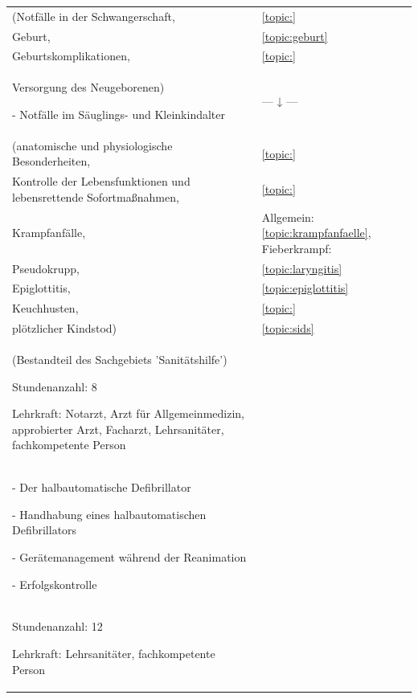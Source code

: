 \begin{xtabular}{p{10cm}p{5cm}}
(Notfälle in der Schwangerschaft,
& 
\ref{topic:}\noindent{}
\\
Geburt,
& 
\ref{topic:geburt}
\\
Geburtskomplikationen,
& 
\ref{topic:}\noindent{}
\\
Versorgung des Neugeborenen)

- Notfälle im Säuglings- und Kleinkindalter
& 
--- ↓ --- 
\\
(anatomische und physiologische Besonderheiten,
& 
\ref{topic:}\noindent{}
\\
Kontrolle der Lebensfunktionen und lebensrettende Sofortmaßnahmen,
& 
\ref{topic:}\noindent{}
\\
Krampfanfälle,
& 
Allgemein: \ref{topic:krampfanfaelle}, Fieberkrampf: \label{topic:fieberkrampf}
\\
Pseudokrupp,
& 
\ref{topic:laryngitis}
\\
Epiglottitis,
& 
\ref{topic:epiglottitis}
\\
Keuchhusten,
& 
\ref{topic:}\noindent{}
\\
plötzlicher Kindstod)
& 
\ref{topic:sids}
 \\\toprule
{}  

(Bestandteil des Sachgebiets  'Sanitätshilfe')  

\begin{inparadesc}
\item[Stundenanzahl:]   8
\item[Lehrkraft:]   Notarzt,  Arzt für Allgemeinmedizin,  approbierter Arzt,
Facharzt, Lehrsanitäter, fachkompetente Person
\end{inparadesc}

\\\midrule
- Der halbautomatische Defibrillator          

- Handhabung eines halbautomatischen Defibrillators         

- Gerätemanagement während der Reanimation 

- Erfolgskontrolle
 \\\toprule
{}  



\begin{inparadesc}
\item[Stundenanzahl:]  12 
\item[Lehrkraft:]   Lehrsanitäter, fachkompetente Person
\end{inparadesc}


\end{xtabular}
